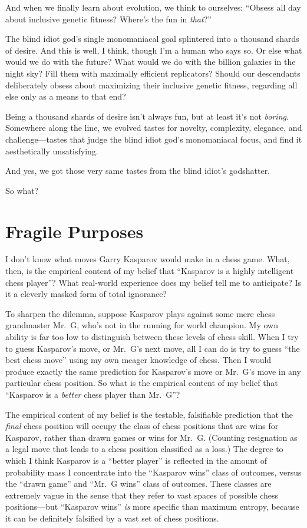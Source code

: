  And when we finally learn about evolution, we think to ourselves:
``Obsess all day about inclusive genetic fitness?
Where's the fun in \textit{that}?''


 The blind idiot god's single monomaniacal goal
splintered into a thousand shards of desire. And this is well, I think,
though I'm a human who says so. Or else what would we
do with the future? What would we do with the billion galaxies in the
night sky? Fill them with maximally efficient replicators? Should our
descendants deliberately obsess about maximizing their inclusive
genetic fitness, regarding all else only as a means to that end?


 Being a thousand shards of desire isn't always
fun, but at least it's not \textit{boring}. Somewhere
along the line, we evolved tastes for novelty, complexity, elegance,
and challenge---tastes that judge the blind idiot god's
monomaniacal focus, and find it aesthetically unsatisfying.


 And yes, we got those very same tastes from the blind
idiot's godshatter.


 So what?

\myendsectiontext

\chapter{Fragile Purposes}



 I don't know what moves Garry Kasparov would make
in a chess game. What, then, is the empirical content of my belief that
``Kasparov is a highly intelligent chess
player''? What real-world experience does my belief
tell me to anticipate? Is it a cleverly masked form of total ignorance?



 To sharpen the dilemma, suppose Kasparov plays against some mere
chess grandmaster Mr.~G, who's not in the running for
world champion. My own ability is far too low to distinguish between
these levels of chess skill. When I try to guess
Kasparov's move, or Mr.~G's next move,
all I can do is try to guess ``the best chess
move'' using my own meager knowledge of chess. Then I
would produce exactly the same prediction for
Kasparov's move or Mr.~G's move in any
particular chess position. So what is the empirical content of my
belief that ``Kasparov is a \textit{better} chess
player than Mr.~G''?


 The empirical content of my belief is the testable, falsifiable
prediction that the \textit{final} chess position will occupy the class
of chess positions that are wins for Kasparov, rather than drawn games
or wins for Mr.~G. (Counting resignation as a legal move that leads to
a chess position classified as a loss.) The degree to which I think
Kasparov is a ``better player'' is
reflected in the amount of probability mass I concentrate into the
``Kasparov wins'' class of outcomes,
versus the ``drawn game'' and
``Mr.~G wins'' class of outcomes.
These classes are extremely vague in the sense that they refer to vast
spaces of possible chess positions---but ``Kasparov
wins'' \textit{is} more specific than maximum
entropy, because it can be definitely falsified by a vast set of chess
positions.


